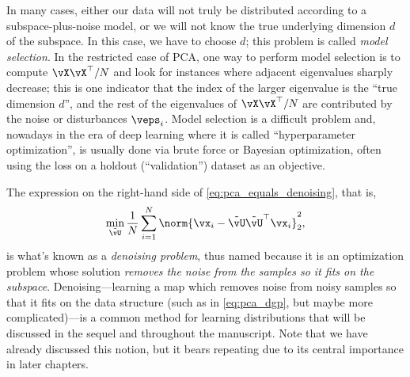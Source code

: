 \documentclass[../../book-main.tex]{subfiles}
\begin{document}
\begin{remark}
    In many cases, either our data will not truly be distributed
    according to a subspace-plus-noise model, or we will not know the
    true underlying dimension \(d\) of the subspace. In this case, we
    have to choose \(d\); this problem is called \textit{model
    selection}. In the restricted case of PCA, one way to perform
    model selection is to compute \(\vX\vX^{\top}/N\) and look for
    instances where adjacent eigenvalues sharply decrease; this is
    one indicator that the index of the larger eigenvalue is the
    ``true dimension \(d\)'', and the rest of the eigenvalues of
    \(\vX\vX^{\top}/N\) are contributed by the noise or disturbances
    \(\veps_{i}\). Model selection is a difficult problem and,
    nowadays in the era of deep learning where it is called
    ``hyperparameter optimization'', is usually done via brute force
    or Bayesian optimization, often using the loss on a holdout
    (``validation'') dataset as an objective. %
\end{remark}

\begin{remark}
    The expression on the right-hand side of
    \eqref{eq:pca_equals_denoising}, that is,
    \begin{equation}\label{eq:orthogonal_denoising}
        \min_{\tilde{\vU}}\frac{1}{N}\sum_{i = 1}^{N}\norm{\vx_{i} -
        \tilde{\vU}\tilde{\vU}^{\top}\vx_{i}}_{2}^{2},
    \end{equation}
    is what's known as a \textit{denoising problem}, thus named
    because it is an optimization problem whose solution
    \textit{removes the noise from the samples so it fits on the
    subspace}. Denoising---learning a map which removes noise from
    noisy samples so that it fits on the data structure (such as in
    \eqref{eq:pca_dgp}, but maybe more complicated)---is a common
    method for learning distributions that will be discussed in the
    sequel and throughout the manuscript. Note that we have already
    discussed this notion, but it bears repeating due to its central
    importance in later chapters.
\end{remark}
\end{document}
